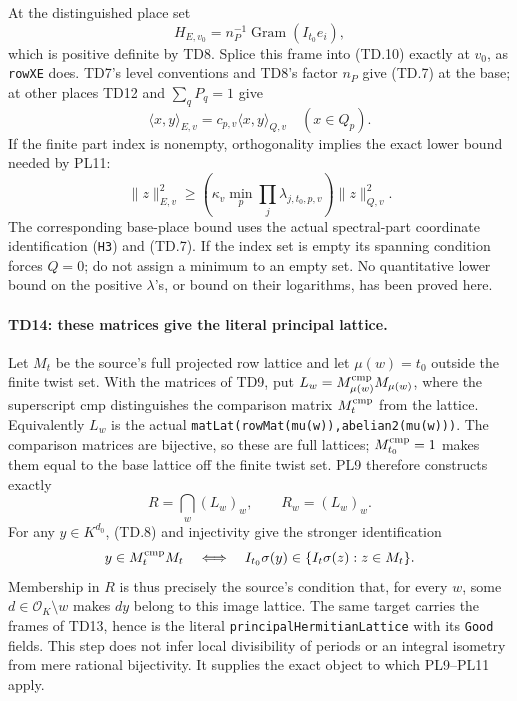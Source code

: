 At the distinguished place set
\[
 H_{E,v_0}=n_P^{-1}\operatorname{Gram}(I_{t_0}e_i),
 \tag{TD.11}
\]
which is positive definite by TD8. Splice this frame into (TD.10)
exactly at $v_0$, as \texttt{rowXE} does. TD7's level conventions and
TD8's factor $n_P$ give (TD.7) at the base; at other places TD12 and
$\sum_qP_q=1$ give
\[
 \langle x,y\rangle_{E,v}=c_{p,v}\langle x,y\rangle_{Q,v}
 \quad(x\in Q_p).
 \tag{TD.12}
\]
If the finite part index is nonempty, orthogonality implies the exact
lower bound needed by PL11:
\[
 \|z\|_{E,v}^2\ge
  \left(\kappa_v\min_p\prod_j\lambda_{j,t_0,p,v}\right)
  \|z\|_{Q,v}^2.
 \tag{TD.13}
\]
The corresponding base-place bound uses the actual spectral-part
coordinate identification (\texttt{H3}) and (TD.7). If the index set is
empty its spanning condition forces $Q=0$; do not assign a minimum to
an empty set. No quantitative lower bound on the positive
$\lambda$'s, or bound on their logarithms, has been proved here.

\paragraph{TD14: these matrices give the literal principal lattice.}
Let $M_t$ be the source's full projected row lattice and let
$\mu(w)=t_0$ outside the finite twist set. With the matrices of TD9,
put $L_w=M_{\mu(w)}^{\rm cmp}M_{\mu(w)}$, where the superscript
$\mathrm{cmp}$ distinguishes the comparison matrix $M_t^{\rm cmp}$
from the lattice. Equivalently $L_w$ is the actual
\texttt{matLat(rowMat(mu(w)),abelian2(mu(w)))}.
The comparison matrices are bijective, so these are full lattices;
$M_{t_0}^{\rm cmp}=1$ makes them equal to the base lattice off the
finite twist set. PL9 therefore constructs exactly
\[
 R=\bigcap_w(L_w)_w,\qquad R_w=(L_w)_w.
\]
For any $y\in K^{d_0}$, (TD.8) and injectivity give the stronger
identification
\[
 y\in M_t^{\rm cmp}M_t
 \quad\Longleftrightarrow\quad
 I_{t_0}\sigma(y)\in\{I_t\sigma(z):z\in M_t\}.
\]
Membership in $R$ is thus precisely the source's condition that, for
every $w$, some $d\in\mathcal O_K\setminus w$ makes
$d y$ belong to this image lattice. The same target carries the frames
of TD13, hence is the literal \texttt{principalHermitianLattice} with
its \texttt{Good} fields. This step does not infer local divisibility
of periods or an integral isometry from mere rational bijectivity.
It supplies the exact object to which PL9--PL11 apply.


